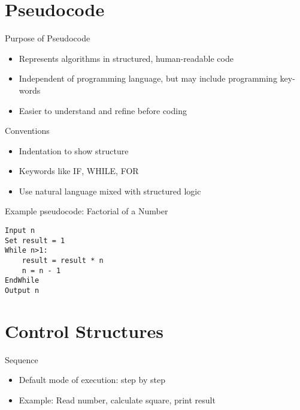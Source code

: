 \documentclass[12pt, aspectratio=169]{beamer}
\begin{document}
    \section{Pseudocode}


    \begin{frame}{Purpose of Pseudocode}
        \begin{itemize}
            \item Represents algorithms in structured, human-readable code
            \item Independent of programming language, but may include programming key-words
            \item Easier to understand and refine before coding
        \end{itemize}
    \end{frame}


    \begin{frame}{Conventions}
        \begin{itemize}
            \item Indentation to show structure
            \item Keywords like IF, WHILE, FOR
            \item Use natural language mixed with structured logic
        \end{itemize}
    \end{frame}


    \begin{frame}[fragile]{Example pseudocode: Factorial of a Number}
        \begin{verbatim}
Input n
Set result = 1
While n>1:
    result = result * n
    n = n - 1
EndWhile
Output n
        \end{verbatim}
    \end{frame}


    \section{Control Structures}

    \begin{frame}{Sequence}
        \begin{itemize}
            \item Default mode of execution: step by step
            \item Example: Read number, calculate square, print result
        \end{itemize}
    \end{frame}
\end{document}
